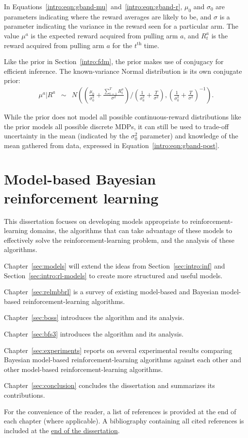 In Equations~\ref{intro:eqn:gband-mu}~and~\ref{intro:eqn:gband-r}, $\mu_0$ and $\sigma_0$ are parameters indicating where the reward averages are likely to be, and $\sigma$ is a parameter indicating the variance in the reward seen for a particular arm. The value $\mu^a$ is the expected reward acquired from pulling arm $a$, and $R_t^a$ is the reward acquired from pulling arm $a$ for the $t^{\mbox{th}}$ time.

Like the  prior in Section~\ref{intro:fdm}, the  prior makes use of conjugacy for efficient inference. The known-variance Normal distribution is its own conjugate prior:
\begin{eqnarray}
\label{intro:eqn:gband-post}\mu^a|R^a &\sim& N\left(\left(\frac{\mu_0}{\sigma_0^2} + \frac{\sum_{t=1}^T R_t^a}{\sigma^2}\right)/\left(\frac 1 {\sigma_0^2} + \frac T {\sigma^2} \right), \left(\frac 1 {\sigma_0^2} + \frac T {\sigma^2} \right)^{-1}\right).
\end{eqnarray}

While the  prior does not model all possible continuous-reward distributions like the  prior models all possible discrete MDPs, it can still be used to trade-off uncertainty in the mean (indicated by the $\sigma_0^2$ parameter) and knowledge of the mean gathered from data, expressed in Equation~\ref{intro:eqn:gband-post}.

\section{Model-based Bayesian reinforcement learning}

This dissertation focuses on developing models appropriate to reinforcement-learning domains, the algorithms that can take advantage of these models to effectively solve the reinforcement-learning problem, and the analysis of these algorithms.

Chapter~\ref{sec:models} will extend the ideas from Section~\ref{sec:intro:inf} and Section~\ref{sec:intro:rl-models} to create more structured and useful models.

Chapter~\ref{sec:relmbbrl} is a survey of existing model-based and Bayesian model-based reinforcement-learning algorithms.

Chapter~\ref{sec:boss} introduces the  algorithm and its analysis.

Chapter~\ref{sec:bfs3} introduces the  algorithm and its analysis.

Chapter~\ref{sec:experiments} reports on several experimental results comparing Bayesian model-based reinforcement-learning algorithms against each other and other model-based reinforcement-learning algorithms.

Chapter~\ref{sec:conclusion} concludes the dissertation and summarizes its contributions.

%
\ifperchapterbib%
For the convenience of the reader, a list of references is provided at the end of each chapter (where applicable).
\ifendbib%
A bibliography containing all cited references is included at the \hyperref[sec:bibliography]{end of the dissertation}.
\else\fi%
\cbend%
\else\fi%